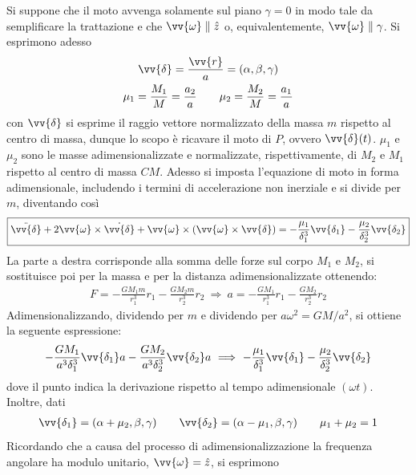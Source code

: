 \documentclass[a4paper, oneside]{book}
\begin{document}
Si suppone che il moto avvenga solamente sul piano $\gamma = 0$
in modo tale da semplificare la trattazione e che $\vv{\omega} \parallel \hat{z}$
o, equivalentemente, $\vv{\omega} \parallel \gamma$. Si esprimono adesso 
\begin{gather*}
    \vv{\delta} = \frac{\vv{r} }{a} = (\alpha, \beta, \gamma) \\
    \mu_1 = \frac{M_1}{M} = \frac{a_2}{a} \qquad \mu_2 = \frac{M_2}{M} = \frac{a_1}{a} 
\end{gather*}
con $\vv{\delta}$ si esprime il raggio vettore normalizzato della massa $m$
rispetto al centro di massa, dunque lo scopo è ricavare il moto di $P$, ovvero $\vv{\delta}(t)$. 
$\mu_1$ e $\mu_2$ sono le masse adimensionalizzate e normalizzate, rispettivamente, di $M_2$ e $M_1$
rispetto al centro di massa $CM$. 
Adesso si imposta l'equazione di moto in forma adimensionale, includendo i termini di 
accelerazione non inerziale e si divide per $m$, diventando così 
\begin{align}
    \boxed{\ddot{\vv{\delta} }  + 2\vv{\omega} \times \dot{\vv{\delta} } + \vv{\omega} \times (\vv{\omega} \times \vv{\delta}  )  = - \frac{\mu_1}{\delta_1^{3}}\vv{\delta_1} - \frac{\mu_2}{\delta_2^{3}} \vv{\delta_2}  }
\end{align} 
La parte a destra corrisponde alla somma delle forze sul corpo $M_1$ e $M_2$, si sostituisce
poi per la massa e per la distanza adimensionalizzate ottenendo:
\begin{gather*}
    F = -\frac{GM_1m}{r_1^{3}}r_1 - \frac{GM_2 m}{r_2^{3}}r_2  \ \Longrightarrow \ a = - \frac{GM_1}{r_1^{3}}r_1 - \frac{GM_2}{r_2^{3}}r_2
\end{gather*}
Adimensionalizzando, dividendo per $m$ e dividendo per $a\omega^{2} = GM/a^{2}$, si ottiene la seguente espressione:
\begin{gather*}
    -\frac{GM_1}{a^{3}\delta_1^{3}}\vv{\delta_1}a - \frac{GM_2}{a^{3}\delta_2^{3}}\vv{\delta_2}a \ \Longrightarrow \   - \frac{\mu_1}{\delta_1^{3}}\vv{\delta_1} - \frac{\mu_2}{\delta_2^{3}}\vv{\delta_2}  
\end{gather*}
dove il punto indica la derivazione rispetto al tempo adimensionale $(\omega t)$.
Inoltre, dati
\begin{gather*}
    \vv{\delta_1} = (\alpha + \mu_2, \beta, \gamma) \qquad \vv{\delta_2} = (\alpha - \mu_1, \beta, \gamma)  \qquad \mu_1 + \mu_2 = 1
\end{gather*}
Ricordando che a causa del processo di adimensionalizzazione 
la frequenza angolare ha modulo unitario, $\vv{\omega} = \hat{z}$, si esprimono 
\end{document}
